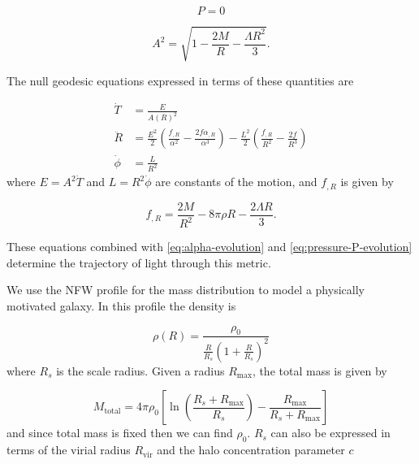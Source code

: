 \begin{equation}
  P = 0
\end{equation}

\begin{equation}
  A^2 = \sqrt{1- \frac{2M}{R} - \frac{\Lambda R^2}{3}}.
\end{equation}

The null geodesic equations expressed in terms of these quantities are

\begin{subequations}
  \begin{align}
    \dot{T} &= \frac{E}{A(R)^2}\\
    \ddot{R} &= \frac{E^2}{2}\left ( \frac{f_{,R}}{\alpha^2} - \frac{2f\alpha_{,R}}{\alpha^3} \right ) - \frac{L^2}{2} \left ( \frac{f_{,R}}{R^2} - \frac{2f}{R^3} \right )\\
    \dot{\phi} &= \frac{L}{R^2}
  \end{align}
  \label{eq:ltb-null-geodesics}
\end{subequations}
where $E = A^2\dot{T}$ and $L = R^2\dot{\phi}$ are constants of the motion, and $f_{,R}$ is given by

\begin{equation}
  f_{,R} = \frac{2M}{R^2} - 8\pi \rho R - \frac{2 \Lambda R}{3}.
\end{equation}

These equations combined with \autoref{eq:alpha-evolution} and \autoref{eq:pressure-P-evolution} determine the trajectory of light through this metric. 

We use the NFW profile \citep{navarro1996structure} for the mass distribution to model a physically motivated galaxy. In this profile the density is

\begin{equation}
  \rho(R) = \frac{\rho_0}{\frac{R}{R_s} \left ( 1 + \frac{R}{R_s} \right )^2}
  \label{eq:nfw-density}
\end{equation}
where $R_s$ is the scale radius. Given a radius $R_{\text{max}}$, the total mass is given by

\begin{equation}
  M_{\text{total}} = 4\pi \rho_0 \left [  \ln \left ( \frac{R_s + R_{\text{max}}}{R_s} \right ) - \frac{R_{\text{max}}}{R_s + R_{\text{max}}} \right ]
  \label{eq:nfw-total-mass}
\end{equation}
and since total mass is fixed then we can find $\rho_0$. $R_s$ can also be expressed in terms of the virial radius $R_{\text{vir}}$ and the halo concentration parameter $c$


